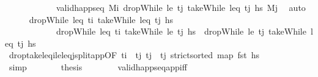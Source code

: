 \begin{isabellebody}
\ \ \ \ \ \ \ \ \ \ \ \ {\isacartoucheopen}valid{\isacharunderscore}{\kern0pt}happ{\isacharunderscore}{\kern0pt}seq\ M\isactrlsub i{\isacharprime}{\kern0pt}\ {\isacharparenleft}{\kern0pt}dropWhile\ {\isacharparenleft}{\kern0pt}le\ t\isactrlsub j{\isacharparenright}{\kern0pt}\ {\isacharparenleft}{\kern0pt}takeWhile\ {\isacharparenleft}{\kern0pt}leq\ t\isactrlsub j{\isacharparenright}{\kern0pt}\ hs\ M\isactrlsub j{\isacartoucheclose}\ \isamarkupfalse%
\ auto\isanewline
\ \ \ \ \isamarkupfalse%
\ {\isachardoublequoteopen}dropWhile\ {\isacharparenleft}{\kern0pt}leq\ t\isactrlsub i{\isacharparenright}{\kern0pt}\ {\isacharparenleft}{\kern0pt}takeWhile\ {\isacharparenleft}{\kern0pt}leq\ t\isactrlsub j{\isacharparenright}{\kern0pt}\ hs\ \isanewline
\ \ \ \ \ \ \ \ \ \ \ {\isacharequal}{\kern0pt}\ dropWhile\ {\isacharparenleft}{\kern0pt}leq\ t\isactrlsub i{\isacharparenright}{\kern0pt}\ {\isacharparenleft}{\kern0pt}takeWhile\ {\isacharparenleft}{\kern0pt}le\ t\isactrlsub j{\isacharparenright}{\kern0pt}\ hs\ {\isacharat}{\kern0pt}\ dropWhile\ {\isacharparenleft}{\kern0pt}le\ t\isactrlsub j{\isacharparenright}{\kern0pt}\ {\isacharparenleft}{\kern0pt}takeWhile\ {\isacharparenleft}{\kern0pt}leq\ t\isactrlsub j{\isacharparenright}{\kern0pt}\ hs\isanewline
\ \ \ \ \ \ \isamarkupfalse%
\ drop{\isacharunderscore}{\kern0pt}take{\isacharunderscore}{\kern0pt}leq\isactrlsub i{\isacharunderscore}{\kern0pt}le{\isacharunderscore}{\kern0pt}leq\isactrlsub j{\isacharunderscore}{\kern0pt}split{\isacharunderscore}{\kern0pt}app{\isacharbrackleft}{\kern0pt}OF\ {\isacartoucheopen}t\isactrlsub i\ {\isacharless}{\kern0pt}\ t\isactrlsub j{\isacartoucheclose}\ {\isacartoucheopen}t\isactrlsub j\ {\isasymle}\ t\isactrlsub j{\isacartoucheclose}\ {\isacartoucheopen}strict{\isacharunderscore}{\kern0pt}sorted\ {\isacharparenleft}{\kern0pt}map\ fst\ hs\ \isanewline
\ \ \ \ \ \ \isamarkupfalse%
\ simp\isanewline
\ \ \ \ \isamarkupfalse%
\ \isamarkupfalse%
\ {\isacharquery}{\kern0pt}thesis\isanewline
\ \ \ \ \ \ \isamarkupfalse%
\ valid{\isacharunderscore}{\kern0pt}happ{\isacharunderscore}{\kern0pt}seq{\isacharunderscore}{\kern0pt}app{\isacharunderscore}{\kern0pt}iff\ {}\ {}\ \isamarkupfalse%

\end{isabellebody}
